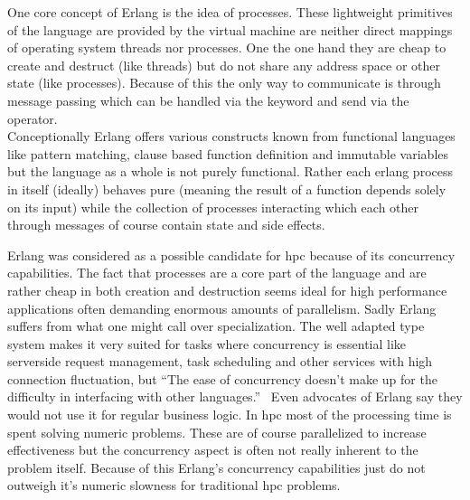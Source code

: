 One core concept of Erlang is the idea of processes. These lightweight primitives of the language are provided by the virtual machine are neither direct mappings of operating system threads nor processes. One the one hand they are cheap to create and destruct (like threads) but do not share any address space or other state (like processes). Because of this the only way to communicate is through message passing which can be handled via the  keyword and send via the \mdinline{!} operator.~\cite{erlang_phd, intro_erlang}
\\


Conceptionally Erlang offers various constructs known from functional languages like pattern matching, clause based function definition and immutable variables but the language as a whole is not purely functional. Rather each erlang process in itself (ideally) behaves pure (meaning the result of a function depends solely on its input) while the collection of processes interacting which each other through messages of course contain state and side effects.

Erlang was considered as a possible candidate for \gls{hpc} because of its concurrency capabilities. The fact that processes are a core part of the language and are rather cheap in both creation and destruction seems ideal for high performance applications often demanding enormous amounts of parallelism. Sadly Erlang suffers from what one might call over specialization. The well adapted type system makes it very suited for tasks where concurrency is essential like serverside request management, task scheduling and other services with high connection fluctuation, but ``The ease of concurrency doesn’t make up for the difficulty in interfacing with other languages.''~\cite{erlang_fps} Even advocates of Erlang say they would not use it for regular business logic. In \gls{hpc} most of the processing time is spent solving numeric problems. These are of course parallelized to increase effectiveness but the concurrency aspect is often not really inherent to the problem itself. Because of this Erlang's concurrency capabilities just do not outweigh it's numeric slowness for traditional \gls{hpc} problems.~\cite{erlang_guide}

%
%


